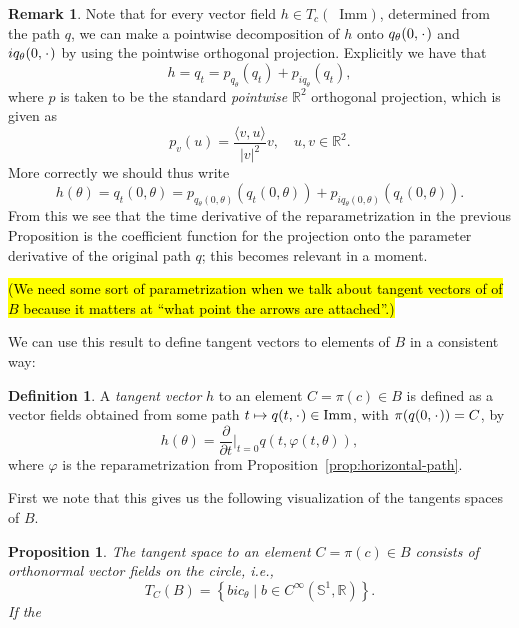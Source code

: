 \message{ !name(tangent_space_of_curves.tex)}\documentclass[a4,danish]{article}
\theoremstyle{break}
\newtheorem{proposition}[subsection]{Proposition}
\theoremstyle{definition}
\newtheorem{definition}[subsection]{Definition}
\theoremstyle{Break}
\newtheorem{remark}[subsection]{Remark}
\newcommand{\R}{\mathbb{R}}
\newcommand*\I{\mathop{}\!\mathrm{Imm}}
\renewcommand{\S}{\mathbb{S}}
\newcommand{\blank}{\makebox[1ex]{\textbf{$\cdot$}}}
\renewcommand{\phi}{\varphi}
\begin{document}
\begin{remark}
  \label{remark:ortho-decom}
  Note that for every vector field $h \in T_c(\I)$, determined from the path $q$, we can make a pointwise decomposition of $h$ onto $q_{\theta}(0, \blank)$ and $iq_{\theta}(0, \blank)$ by using the pointwise orthogonal projection. Explicitly we have that
  \begin{equation*}
    h = q_t = p_{q_{\theta}}(q_{t}) + p_{iq_{\theta}}(q_{t}), 
  \end{equation*}
  where $p$ is taken to be the standard \textit{pointwise} $\R^2$ orthogonal projection, which is given as
  \begin{equation*}
    p_v(u) = \frac{\langle v, u \rangle}{|v|^2} v, \quad u, v \in \R^2.
  \end{equation*}
  More correctly we should thus write
  \begin{equation*}
    h(\theta) = q_t(0,\theta) = p_{q_{\theta}(0,\theta)}(q_{t}(0,\theta)) +
    p_{iq_{\theta}(0,\theta)}(q_{t}(0,\theta)).
  \end{equation*}
  From this we see that the time derivative of the reparametrization in the previous Proposition is the coefficient function for the projection onto the parameter derivative of the original path $q$; this becomes relevant in a moment. 
\end{remark}

\hl{(We need some sort of parametrization when we talk about tangent vectors of of $B$ because it matters at ``what point the arrows are attached''.)}

We can use this result to define tangent vectors to elements of $B$ in
a consistent way:

\begin{definition}
  \label{def:tang-quotient}
  A \textit{tangent vector} $h$ to an element $C = \pi(c) \in B$ is defined as a vector fields obtained from some path $t \mapsto q(t, \blank) \in \I$, with $\pi(q(0,\blank)) = C$, by
  \begin{equation}
    \label{eq:tang-quotient}
    h(\theta) = \frac{\partial }{\partial t} \bigg\vert_{t=0} q(t, \phi(t,\theta)),
  \end{equation}
  where $\phi$ is the reparametrization from Proposition~\ref{prop:horizontal-path}. 
\end{definition}

First we note that this gives us the following visualization of the tangents spaces of $B$.

\begin{proposition}
The tangent space to an element $C = \pi(c) \in B$ consists of orthonormal vector fields on the circle, i.e.,
  \begin{equation*}
    T_C(B) = 
    \left\{
      b i c_{\theta} \mid b \in C^{\infty}(\S^1,\R)
    \right\}.
  \end{equation*}
  If the 
\end{proposition}
\end{document}
